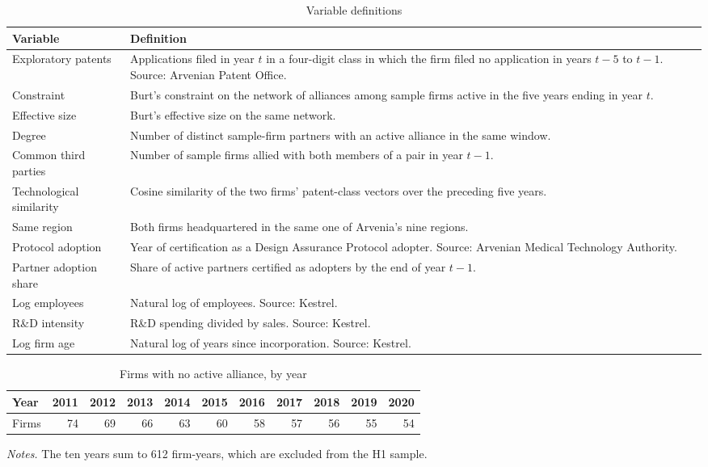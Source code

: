 \documentclass[12pt]{article}
\begin{document}
\begin{table}[h]
\centering
\begin{threeparttable}
\caption{Variable definitions}
\label{tab:defs}
\small
\singlespacing
\begin{tabular}{p{4.2cm}p{10.6cm}}
\toprule
Variable & Definition \\
\midrule
Exploratory patents & Applications filed in year $t$ in a four-digit class in which the firm filed no application in years $t-5$ to $t-1$. Source: Arvenian Patent Office. \\
Constraint & Burt's constraint on the network of alliances among sample firms active in the five years ending in year $t$. \\
Effective size & Burt's effective size on the same network. \\
Degree & Number of distinct sample-firm partners with an active alliance in the same window. \\
Common third parties & Number of sample firms allied with both members of a pair in year $t-1$. \\
Technological similarity & Cosine similarity of the two firms' patent-class vectors over the preceding five years. \\
Same region & Both firms headquartered in the same one of Arvenia's nine regions. \\
Protocol adoption & Year of certification as a Design Assurance Protocol adopter. Source: Arvenian Medical Technology Authority. \\
Partner adoption share & Share of active partners certified as adopters by the end of year $t-1$. \\
Log employees & Natural log of employees. Source: Kestrel. \\
R\&D intensity & R\&D spending divided by sales. Source: Kestrel. \\
Log firm age & Natural log of years since incorporation. Source: Kestrel. \\
\bottomrule
\end{tabular}
\end{threeparttable}
\end{table}

\begin{table}[h]
\centering
\begin{threeparttable}
\caption{Firms with no active alliance, by year}
\label{tab:isolates}
\small
\singlespacing
\begin{tabular}{lrrrrrrrrrr}
\toprule
Year & 2011 & 2012 & 2013 & 2014 & 2015 & 2016 & 2017 & 2018 & 2019 & 2020 \\
\midrule
Firms & 74 & 69 & 66 & 63 & 60 & 58 & 57 & 56 & 55 & 54 \\
\bottomrule
\end{tabular}
\begin{tablenotes}
\footnotesize
\item \textit{Notes.} The ten years sum to 612 firm-years, which are excluded from the H1 sample.
\end{tablenotes}
\end{threeparttable}
\end{table}
\end{document}
